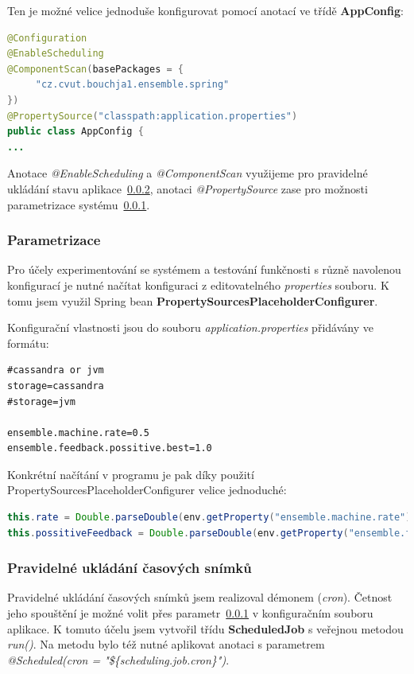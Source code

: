 \documentclass[thesis=M,czech]{FITthesis}[2014/05/07]
\begin{document}
Ten je možné velice jednoduše konfigurovat pomocí anotací ve třídě \textbf{AppConfig}:

\begin{lstlisting}[language=java]
@Configuration
@EnableScheduling
@ComponentScan(basePackages = {
     "cz.cvut.bouchja1.ensemble.spring"
})
@PropertySource("classpath:application.properties")
public class AppConfig {
...
\end{lstlisting}

Anotace \emph{@EnableScheduling} a \emph{@ComponentScan} využijeme pro pravidelné ukládání stavu aplikace~\ref{task}, anotaci \emph{@PropertySource} zase pro možnosti parametrizace systému~\ref{param}.

\subsubsection{Parametrizace}
\label{param}
Pro účely experimentování se systémem a testování funkčnosti s různě navolenou konfigurací je nutné načítat konfiguraci z editovatelného \emph{properties} souboru. K tomu jsem využil Spring bean \textbf{PropertySourcesPlaceholderConfigurer}.

Konfigurační vlastnosti jsou do souboru \emph{application.properties} přidávány ve formátu:

\begin{lstlisting}
#cassandra or jvm
storage=cassandra
#storage=jvm
   
ensemble.machine.rate=0.5
ensemble.feedback.possitive.best=1.0
\end{lstlisting}

Konkrétní načítání v programu je pak díky použití PropertySourcesPlaceholderConfigurer velice jednoduché:

\begin{lstlisting}[language=java]
this.rate = Double.parseDouble(env.getProperty("ensemble.machine.rate"));
this.possitiveFeedback = Double.parseDouble(env.getProperty("ensemble.feedback.possitive.best"));
\end{lstlisting}

\subsubsection{Pravidelné ukládání časových snímků}
\label{task}
Pravidelné ukládání časových snímků jsem realizoval démonem (\emph{cron}). Četnost jeho spouštění je možné volit přes parametr~\ref{param} v konfiguračním souboru aplikace. K tomuto účelu jsem vytvořil třídu \textbf{ScheduledJob} s veřejnou metodou \emph{run()}. Na metodu bylo též nutné aplikovat anotaci s parametrem \emph{@Scheduled(cron = "\$\{scheduling.job.cron\}")}.
\end{document}
